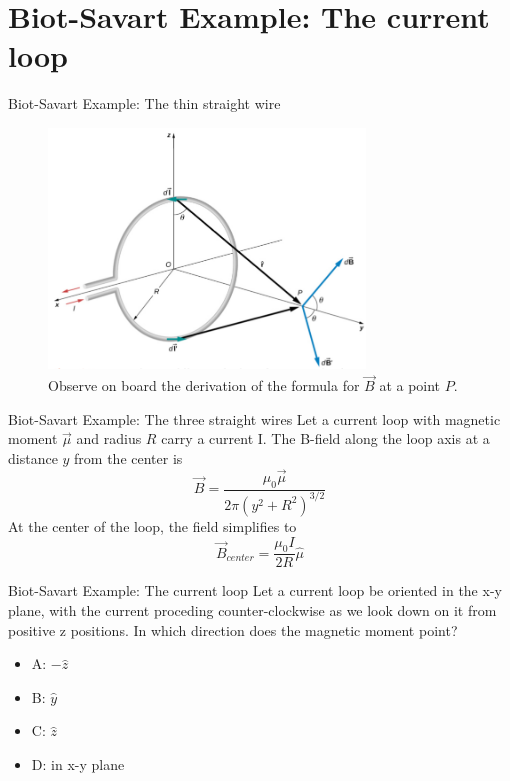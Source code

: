 \documentclass{beamer}
\begin{document}
\section{Biot-Savart Example: The current loop}

\begin{frame}{Biot-Savart Example: The thin straight wire}
\begin{figure}
\centering
\includegraphics[width=0.75\textwidth]{figures/magloop.png}
\caption{\label{fig:biot4} Observe on board the derivation of the formula for $\vec{B}$ at a point $P$.}
\end{figure}
\end{frame}

\begin{frame}{Biot-Savart Example: The three straight wires}
Let a current loop with magnetic moment $\vec{\mu}$ and radius $R$ carry a current I.  The B-field along the loop axis at a distance $y$ from the center is
\begin{equation}
\vec{B} = \frac{\mu_0 \vec{\mu}}{2\pi(y^2+R^2)^{3/2}}
\end{equation}
At the center of the loop, the field simplifies to
\begin{equation}
\vec{B}_{center} = \frac{\mu_0 I}{2 R}\hat{\mu}
\end{equation}
\end{frame}

\begin{frame}{Biot-Savart Example: The current loop}
Let a current loop be oriented in the x-y plane, with the current proceding counter-clockwise as we look down on it from positive z positions.  In which direction does the magnetic moment point?
\begin{itemize}
\item A: $-\hat{z}$
\item B: $\hat{y}$
\item C: $\hat{z}$
\item D: in x-y plane
\end{itemize}
\end{frame}
\end{document}

